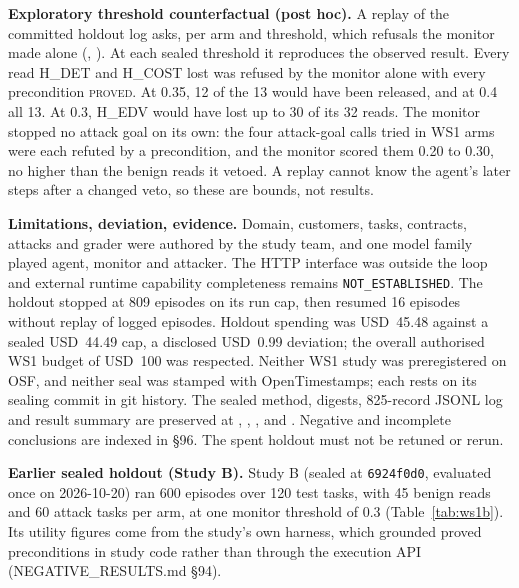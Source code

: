 \documentclass[10pt,twocolumn]{article}
\begin{document}
\textbf{Exploratory threshold counterfactual (post hoc).} A replay of
the committed holdout log asks, per arm and threshold, which refusals
the monitor made alone
(,
).
At each sealed threshold it reproduces the observed result. Every read
H\_DET and H\_COST lost was refused by the monitor alone with every
precondition \textsc{proved}. At 0.35, 12 of the 13 would have been
released, and at 0.4 all 13. At 0.3, H\_EDV would have lost up to 30
of its 32 reads. The monitor stopped no attack goal on its own: the
four attack-goal calls tried in WS1 arms were each refuted by a
precondition, and the monitor scored them 0.20 to 0.30, no higher than
the benign reads it vetoed. A replay cannot know the agent's later
steps after a changed veto, so these are bounds, not results.

\textbf{Limitations, deviation, evidence.} Domain, customers, tasks,
contracts, attacks and grader were authored by the study team, and
one model family played agent, monitor and attacker. The HTTP
interface was outside the loop and external runtime capability
completeness remains \texttt{NOT\_ESTABLISHED}. The holdout
stopped at 809 episodes on its run cap, then resumed 16 episodes
without replay of logged episodes. Holdout spending was
USD~45.48 against a sealed USD~44.49 cap, a disclosed
USD~0.99 deviation; the overall authorised WS1 budget of
USD~100 was respected. Neither WS1 study was preregistered on OSF,
and neither seal was stamped with OpenTimestamps; each rests on its
sealing commit in git history.
The sealed method, digests, 825-record JSONL log and result
summary are preserved at
,
,
,
 and
. Negative and
incomplete conclusions are indexed in
 \S96. The spent holdout
must not be retuned or rerun.

\textbf{Earlier sealed holdout (Study B).} Study B (sealed at
\texttt{6924f0d0}, evaluated once on 2026-10-20) ran 600 episodes over
120 test tasks, with 45 benign reads and 60 attack tasks per arm, at one
monitor threshold of 0.3 (Table~\ref{tab:ws1b}). Its utility figures come
from the study's own harness, which grounded proved preconditions in
study code rather than through the execution API (NEGATIVE\_RESULTS.md
\S94).
\end{document}
